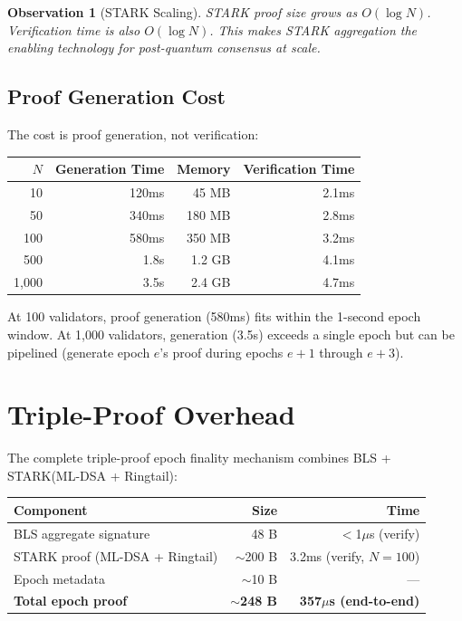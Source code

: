 \documentclass[11pt,a4paper]{article}
\newtheorem{observation}{Observation}[section]
\begin{document}
\begin{observation}[STARK Scaling]
STARK proof size grows as $O(\log N)$. Verification time is also $O(\log N)$. This makes STARK aggregation the enabling technology for post-quantum consensus at scale.
\end{observation}

\subsection{Proof Generation Cost}

The cost is proof generation, not verification:

\begin{center}
\begin{tabular}{rrrr}
\toprule
\textbf{$N$} & \textbf{Generation Time} & \textbf{Memory} & \textbf{Verification Time} \\
\midrule
10 & 120ms & 45 MB & 2.1ms \\
50 & 340ms & 180 MB & 2.8ms \\
100 & 580ms & 350 MB & 3.2ms \\
500 & 1.8s & 1.2 GB & 4.1ms \\
1,000 & 3.5s & 2.4 GB & 4.7ms \\
\bottomrule
\end{tabular}
\end{center}

At 100 validators, proof generation (580ms) fits within the 1-second epoch window. At 1,000 validators, generation (3.5s) exceeds a single epoch but can be pipelined (generate epoch $e$'s proof during epochs $e+1$ through $e+3$).

\section{Triple-Proof Overhead}

The complete triple-proof epoch finality mechanism combines BLS + STARK(ML-DSA + Ringtail):

\begin{center}
\begin{tabular}{lrr}
\toprule
\textbf{Component} & \textbf{Size} & \textbf{Time} \\
\midrule
BLS aggregate signature & 48 B & $<$1$\mu$s (verify) \\
STARK proof (ML-DSA + Ringtail) & $\sim$200 B & 3.2ms (verify, $N=100$) \\
Epoch metadata & $\sim$10 B & --- \\
\midrule
\textbf{Total epoch proof} & \textbf{$\sim$248 B} & \textbf{357$\mu$s (end-to-end)} \\
\bottomrule
\end{tabular}
\end{center}
\end{document}
